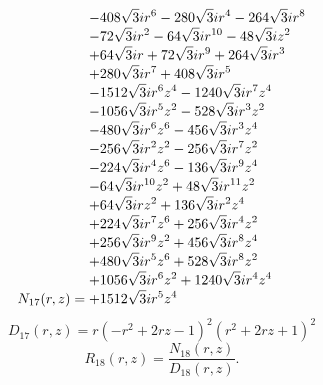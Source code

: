 \documentclass[11pt,a4paper]{article}
\begin{document}
\begin{equation}
N_{17}(r,z)=\shortstack[l]{$\displaystyle  - 408 \sqrt{3} i r^{6} - 280 \sqrt{3} i r^{4} - 264 \sqrt{3} i r^{8}$\\
$\displaystyle  - 72 \sqrt{3} i r^{2} - 64 \sqrt{3} i r^{10} - 48 \sqrt{3} i z^{2}$\\
$\displaystyle  + 64 \sqrt{3} i r + 72 \sqrt{3} i r^{9} + 264 \sqrt{3} i r^{3}$\\
$\displaystyle  + 280 \sqrt{3} i r^{7} + 408 \sqrt{3} i r^{5}$\\
$\displaystyle  - 1512 \sqrt{3} i r^{6} z^{4} - 1240 \sqrt{3} i r^{7} z^{4}$\\
$\displaystyle  - 1056 \sqrt{3} i r^{5} z^{2} - 528 \sqrt{3} i r^{3} z^{2}$\\
$\displaystyle  - 480 \sqrt{3} i r^{6} z^{6} - 456 \sqrt{3} i r^{3} z^{4}$\\
$\displaystyle  - 256 \sqrt{3} i r^{2} z^{2} - 256 \sqrt{3} i r^{7} z^{2}$\\
$\displaystyle  - 224 \sqrt{3} i r^{4} z^{6} - 136 \sqrt{3} i r^{9} z^{4}$\\
$\displaystyle  - 64 \sqrt{3} i r^{10} z^{2} + 48 \sqrt{3} i r^{11} z^{2}$\\
$\displaystyle  + 64 \sqrt{3} i r z^{2} + 136 \sqrt{3} i r^{2} z^{4}$\\
$\displaystyle  + 224 \sqrt{3} i r^{7} z^{6} + 256 \sqrt{3} i r^{4} z^{2}$\\
$\displaystyle  + 256 \sqrt{3} i r^{9} z^{2} + 456 \sqrt{3} i r^{8} z^{4}$\\
$\displaystyle  + 480 \sqrt{3} i r^{5} z^{6} + 528 \sqrt{3} i r^{8} z^{2}$\\
$\displaystyle  + 1056 \sqrt{3} i r^{6} z^{2} + 1240 \sqrt{3} i r^{4} z^{4}$\\
$\displaystyle  + 1512 \sqrt{3} i r^{5} z^{4}$}
\label{eq:cat-numerator-17}
\end{equation}
\begin{equation}
D_{17}(r,z)=r \left(- r^{2} + 2 r z - 1\right)^{2} \left(r^{2} + 2 r z + 1\right)^{2}
\label{eq:cat-denominator-17}
\end{equation}
\begin{equation}
R_{18}(r,z)=\frac{N_{18}(r,z)}{D_{18}(r,z)}.
\label{eq:cat-rational-18}
\end{equation}
\end{document}
